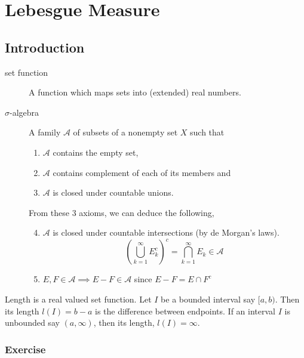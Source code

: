 \section{Lebesgue Measure}
\subsection{Introduction}
\begin{description}
	\item[set function] A function which maps sets into (extended) real numbers.
	\item[$\sigma$-algebra] A family $\mathcal{A}$ of subsets of a nonempty set $X$ such that
	\begin{enumerate}
		\item $\mathcal{A}$ contains the empty set, 
		\item $\mathcal{A}$ contains complement of each of its members and
		\item $\mathcal{A}$ is closed under countable unions.
	\end{enumerate}
	
	From these 3 axioms, we can deduce the following,
	\begin{enumerate}
		\setcounter{enumi}{3}
		\item $\mathcal{A}$ is closed under countable intersections (by de Morgan's laws).
			\[ \left( \bigcup_{k = 1}^\infty E_k^c \right)^c = \bigcap_{k=1}^\infty E_k \in \mathcal{A} \]
		\item $E,F \in \mathcal{A} \implies E-F \in \mathcal{A}$ since $E-F = E \cap F^c$
	\end{enumerate}
\end{description}

\begin{definition}
	Length is a real valued set function.
	Let $I$ be a bounded interval say $[a,b)$.
	Then its length $l(I)=b-a$ is the difference between endpoints.
	If an interval $I$ is unbounded say $(a,\infty)$, then its length, $l(I) = \infty$.
\end{definition}

\subsubsection{Exercise}
